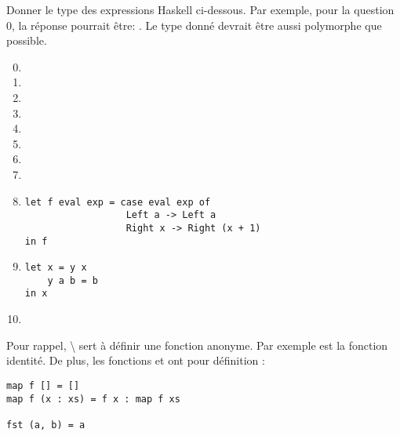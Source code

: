 \begin{Exercise}
Donner le type des expressions Haskell ci-dessous. Par exemple, pour
la question 0, la réponse pourrait être: . Le
type donné devrait être aussi polymorphe que possible.

\begin{enumerate}
\setcounter{enumi}{-1}
\item {}
\item {}
\item \codeinline{['a','b'] ++ ['c','d']}
\item {}
\item {}
\item {}
\item {}
\item \codeinline{[(1, 2), (3, 4)]}
\item 
\begin{verbatim}
let f eval exp = case eval exp of
                  Left a -> Left a
                  Right x -> Right (x + 1)
in f
\end{verbatim}
\item 
\begin{verbatim}
let x = y x
    y a b = b 
in x
\end{verbatim}
\item {}
\end{enumerate}

Pour rappel, {\textbackslash } sert à définir une fonction anonyme. Par
  exemple  est la fonction identité. De plus, les
  fonctions  et  ont pour définition :
\begin{verbatim}
map f [] = []               
map f (x : xs) = f x : map f xs

fst (a, b) = a
\end{verbatim}
\end{Exercise}